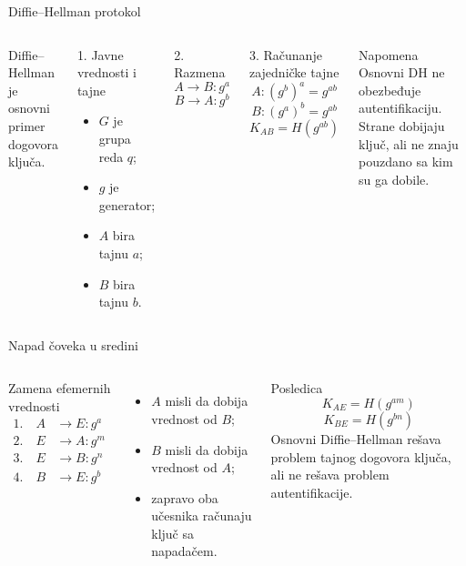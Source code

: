 \documentclass[aspectratio=1610]{beamer}
\newcommand{\Hash}[1]{H(#1)}
\begin{document}
\begin{frame}[t]{Diffie--Hellman protokol}
\small
\begin{columns}[T,onlytextwidth]
Diffie--Hellman je osnovni primer dogovora ključa.
\begin{block}{1. Javne vrednosti i tajne}
\begin{itemize}
    \item $G$ je grupa reda $q$;
    \item $g$ je generator;
    \item $A$ bira tajnu $a$;
    \item $B$ bira tajnu $b$.
\end{itemize}
\end{block}

\begin{block}{2. Razmena}
\[
A \rightarrow B : g^a
\]
\[
B \rightarrow A : g^b
\]
\end{block}

\begin{block}{3. Računanje zajedničke tajne}
\[
A: (g^b)^a=g^{ab}
\]
\[
B: (g^a)^b=g^{ab}
\]
\[
K_{AB}=\Hash{g^{ab}}
\]
\end{block}

\begin{alertblock}{Napomena}
Osnovni DH ne obezbeđuje autentifikaciju. Strane dobijaju ključ, ali ne znaju pouzdano sa kim su ga dobile.
\end{alertblock}
\end{columns}
\end{frame}

\begin{frame}[t]{Napad čoveka u sredini}
\small
\begin{columns}[T,onlytextwidth]
\begin{block}{Zamena efemernih vrednosti}
\[
\begin{aligned}
1.\quad A &\rightarrow E : g^a \\
2.\quad E &\rightarrow A : g^m \\
3.\quad E &\rightarrow B : g^n \\
4.\quad B &\rightarrow E : g^b
\end{aligned}
\]
\end{block}

\begin{itemize}
    \item $A$ misli da dobija vrednost od $B$;
    \item $B$ misli da dobija vrednost od $A$;
    \item zapravo oba učesnika računaju ključ sa napadačem.
\end{itemize}

\begin{alertblock}{Posledica}
\[
K_{AE}=\Hash{g^{am}}
\]
\[
K_{BE}=\Hash{g^{bn}}
\]
Osnovni Diffie--Hellman rešava problem tajnog dogovora ključa, ali ne rešava problem autentifikacije.
\end{alertblock}
\end{columns}
\end{frame}
\end{document}
